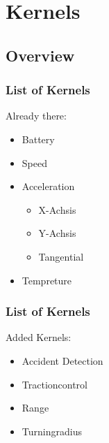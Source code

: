 \documentclass{beamer}
\begin{document}
\section{Kernels}
\subsection{Overview}
\begin{frame} %
  \frametitle{List of Kernels} %
  Already there:
  \begin{itemize}
   \item Battery
   \item Speed
   \item Acceleration
   \begin{itemize}
    \item X-Achsis
    \item Y-Achsis
    \item Tangential
   \end{itemize}
   \item Tempreture
  \end{itemize}
\end{frame}
\begin{frame}
    \frametitle{List of Kernels}
    Added Kernels:
    \begin{itemize}
     \item Accident Detection
     \item Tractioncontrol
     \item Range
     \item Turningradius
    \end{itemize}
\end{frame}
\end{document}

